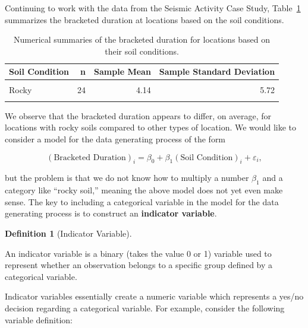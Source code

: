 \documentclass[
  letterpaper,
  DIV=11,
  numbers=noendperiod]{scrreprt}
\theoremstyle{plain}
\theoremstyle{definition}
\theoremstyle{definition}
\newtheorem{definition}{Definition}[chapter]
\theoremstyle{remark}
\begin{document}
Continuing to work with the data from the Seismic Activity Case Study,
Table~\ref{tbl-regextensions-soil} summarizes the bracketed duration at
locations based on the soil conditions.

\hypertarget{tbl-regextensions-soil}{}
\begin{table}
\caption{\label{tbl-regextensions-soil}Numerical summaries of the bracketed duration for locations based on
their soil conditions. }\tabularnewline

\centering
\begin{tabular}[t]{lrrr}
\toprule
Soil Condition & n & Sample Mean & Sample Standard Deviation\\
\midrule
\cellcolor{gray!6}{Intermediate} & \cellcolor{gray!6}{43} & \cellcolor{gray!6}{5.16} & \cellcolor{gray!6}{4.52}\\
Rocky & 24 & 4.14 & 5.72\\
\cellcolor{gray!6}{Soft} & \cellcolor{gray!6}{52} & \cellcolor{gray!6}{5.86} & \cellcolor{gray!6}{6.73}\\
\bottomrule
\end{tabular}
\end{table}

We observe that the bracketed duration appears to differ, on average,
for locations with rocky soils compared to other types of location. We
would like to consider a model for the data generating process of the
form

\[(\text{Bracketed Duration})_i = \beta_0 + \beta_1 (\text{Soil Condition})_i + \varepsilon_i,\]

but the problem is that we do not know how to multiply a number
\(\beta_1\) and a category like ``rocky soil,'' meaning the above model
does not yet even make sense. The key to including a categorical
variable in the model for the data generating process is to construct an
\textbf{indicator variable}.

\begin{definition}[Indicator
Variable]\protect\hypertarget{def-indicator-variable}{}\label{def-indicator-variable}

An indicator variable is a binary (takes the value 0 or 1) variable used
to represent whether an observation belongs to a specific group defined
by a categorical variable.

\end{definition}

Indicator variables essentially create a numeric variable which
represents a yes/no decision regarding a categorical variable. For
example, consider the following variable definition:
\end{document}
